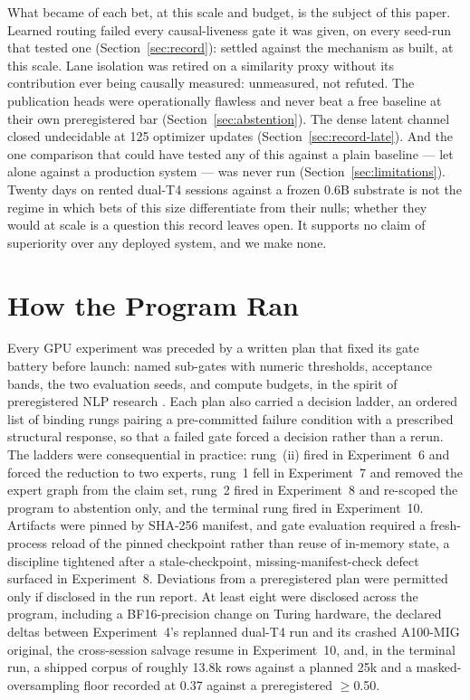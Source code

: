 \documentclass[10pt,a4paper]{article}
\begin{document}
What became of each bet, at this scale and budget, is the subject of this
paper. Learned routing failed every causal-liveness gate it was given, on
every seed-run that tested one (Section~\ref{sec:record}): settled against
the mechanism as built, at this scale. Lane isolation was retired on a
similarity proxy without its contribution ever being causally measured:
unmeasured, not refuted. The publication heads were operationally flawless
and never beat a free baseline at their own preregistered bar
(Section~\ref{sec:abstention}). The dense latent channel closed undecidable
at 125 optimizer updates (Section~\ref{sec:record-late}). And the one
comparison that could have tested any of this against a plain baseline ---
let alone against a production system --- was never run
(Section~\ref{sec:limitations}). Twenty days on rented dual-T4 sessions
against a frozen 0.6B substrate is not the regime in which bets of this size
differentiate from their nulls; whether they would at scale is a question
this record leaves open. It supports no claim of superiority over any
deployed system, and we make none.

\section{How the Program Ran}\label{sec:process}

Every GPU experiment was preceded by a written plan that fixed its gate
battery before launch: named sub-gates with numeric thresholds, acceptance
bands, the two evaluation seeds, and compute budgets, in the spirit of
preregistered NLP research \cite{vanmiltenburg2021}. Each plan also carried a
decision ladder, an ordered list of binding rungs pairing a pre-committed
failure condition with a prescribed structural response, so that a failed gate
forced a decision rather than a rerun. The ladders were consequential in
practice: rung~(ii) fired in Experiment~6 and forced the reduction to two
experts, rung~1 fell in Experiment~7 and removed the expert graph from the
claim set, rung~2 fired in Experiment~8 and re-scoped the program to
abstention only, and the terminal rung fired in Experiment~10. Artifacts were
pinned by SHA-256 manifest, and gate evaluation required a fresh-process
reload of the pinned checkpoint rather than reuse of in-memory state, a
discipline tightened after a stale-checkpoint, missing-manifest-check defect
surfaced in Experiment~8. Deviations from a preregistered plan were permitted
only if disclosed in the run report. At least eight were disclosed across the
program, including a BF16-precision change on Turing hardware, the declared
deltas between Experiment~4's replanned dual-T4 run and its crashed A100-MIG
original, the cross-session salvage resume in Experiment~10, and, in the
terminal run, a shipped corpus of roughly 13.8k rows against a planned 25k and
a masked-oversampling floor recorded at 0.37 against a preregistered
$\ge$0.50.
\end{document}
